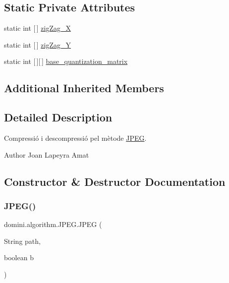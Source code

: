 \subsection*{Static Private Attributes}
\begin{DoxyCompactItemize}
\item 
static int \mbox{[}$\,$\mbox{]} \hyperlink{classdomini_1_1algorithm_1_1JPEG_a7d3829cbffd758c087341a8da13dd2ca}{zig\+Zag\+\_\+X}
\item 
static int \mbox{[}$\,$\mbox{]} \hyperlink{classdomini_1_1algorithm_1_1JPEG_ad886d8aa00a40cb151b446534f0d1bcc}{zig\+Zag\+\_\+Y}
\item 
static int \mbox{[}$\,$\mbox{]}\mbox{[}$\,$\mbox{]} \hyperlink{classdomini_1_1algorithm_1_1JPEG_a1f91c0bad6cfd3ac22bec68bc28564c5}{base\+\_\+quantization\+\_\+matrix}
\end{DoxyCompactItemize}
\subsection*{Additional Inherited Members}


\subsection{Detailed Description}
Compressió i descompressió pel mètode \hyperlink{classdomini_1_1algorithm_1_1JPEG}{J\+P\+EG}. 

\begin{DoxyAuthor}{Author}
Joan Lapeyra Amat 
\end{DoxyAuthor}


\subsection{Constructor \& Destructor Documentation}
\mbox{\label{classdomini_1_1algorithm_1_1JPEG_ac489916de8505f11b6e29c7206baf3c7}} 
\subsubsection{\texorpdfstring{J\+P\+E\+G()}{JPEG()}\hspace{0.1cm}{\footnotesize\ttfamily [1/2]}}
{\footnotesize\ttfamily domini.\+algorithm.\+J\+P\+E\+G.\+J\+P\+EG (\begin{DoxyParamCaption}\item[{String}]{path,  }\item[{boolean}]{b }\end{DoxyParamCaption})\hspace{0.3cm}{\ttfamily [inline]}}



